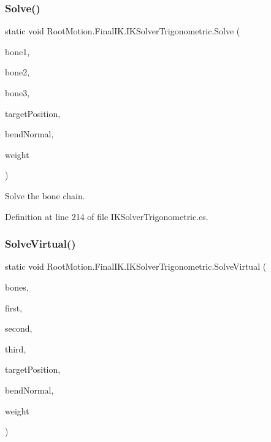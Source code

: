 \subsubsection{\texorpdfstring{Solve()}{Solve()}}
{\footnotesize\ttfamily static void Root\+Motion.\+Final\+I\+K.\+I\+K\+Solver\+Trigonometric.\+Solve (\begin{DoxyParamCaption}\item[{Transform}]{bone1,  }\item[{Transform}]{bone2,  }\item[{Transform}]{bone3,  }\item[{Vector3}]{target\+Position,  }\item[{Vector3}]{bend\+Normal,  }\item[{float}]{weight }\end{DoxyParamCaption})\hspace{0.3cm}{\ttfamily [static]}}



Solve the bone chain. 



Definition at line 214 of file I\+K\+Solver\+Trigonometric.\+cs.

\mbox{\label{class_root_motion_1_1_final_i_k_1_1_i_k_solver_trigonometric_a6d5eeb863d378ba5150479f5ac779e1a}} 
\subsubsection{\texorpdfstring{Solve\+Virtual()}{SolveVirtual()}}
{\footnotesize\ttfamily static void Root\+Motion.\+Final\+I\+K.\+I\+K\+Solver\+Trigonometric.\+Solve\+Virtual (\begin{DoxyParamCaption}\item[{\mbox{\hyperlink{class_root_motion_1_1_final_i_k_1_1_i_k_solver_1_1_bone}{I\+K\+Solver.\+Bone}} \mbox{[}$\,$\mbox{]}}]{bones,  }\item[{int}]{first,  }\item[{int}]{second,  }\item[{int}]{third,  }\item[{Vector3}]{target\+Position,  }\item[{Vector3}]{bend\+Normal,  }\item[{float}]{weight }\end{DoxyParamCaption})\hspace{0.3cm}{\ttfamily [static]}}



